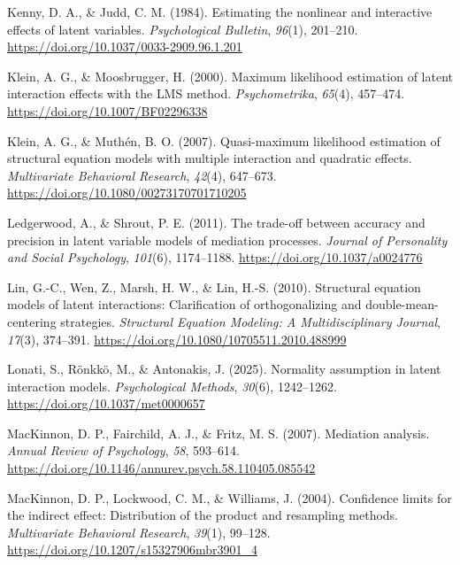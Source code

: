 \documentclass[
  man,
  longtable,
  nolmodern,
  notxfonts,
  notimes,
  colorlinks=true,linkcolor=blue,citecolor=blue,urlcolor=blue]{apa7}
\newlength{\cslhangindent}
\newenvironment{CSLReferences}[2] %
 {\begin{list}{}{%
  \setlength{\itemindent}{0pt}
  \setlength{\leftmargin}{0pt}
  \setlength{\parsep}{0pt}
  \ifodd #1
   \setlength{\leftmargin}{\cslhangindent}
   \setlength{\itemindent}{-1\cslhangindent}
  \fi
  \setlength{\itemsep}{#2\baselineskip}}}
 {\end{list}}
\begin{document}
\begin{CSLReferences}{1}{0}
Kenny, D. A., \& Judd, C. M. (1984). Estimating the nonlinear and
interactive effects of latent variables. \emph{Psychological Bulletin},
\emph{96}(1), 201--210. \url{https://doi.org/10.1037/0033-2909.96.1.201}

Klein, A. G., \& Moosbrugger, H. (2000). Maximum likelihood estimation
of latent interaction effects with the {LMS} method.
\emph{Psychometrika}, \emph{65}(4), 457--474.
\url{https://doi.org/10.1007/BF02296338}

Klein, A. G., \& Muthén, B. O. (2007). Quasi-maximum likelihood
estimation of structural equation models with multiple interaction and
quadratic effects. \emph{Multivariate Behavioral Research},
\emph{42}(4), 647--673. \url{https://doi.org/10.1080/00273170701710205}

Ledgerwood, A., \& Shrout, P. E. (2011). The trade-off between accuracy
and precision in latent variable models of mediation processes.
\emph{Journal of Personality and Social Psychology}, \emph{101}(6),
1174--1188. \url{https://doi.org/10.1037/a0024776}

Lin, G.-C., Wen, Z., Marsh, H. W., \& Lin, H.-S. (2010). Structural
equation models of latent interactions: Clarification of orthogonalizing
and double-mean-centering strategies. \emph{Structural Equation
Modeling: A Multidisciplinary Journal}, \emph{17}(3), 374--391.
\url{https://doi.org/10.1080/10705511.2010.488999}

Lonati, S., Rönkkö, M., \& Antonakis, J. (2025). Normality assumption in
latent interaction models. \emph{Psychological Methods}, \emph{30}(6),
1242--1262. \url{https://doi.org/10.1037/met0000657}

MacKinnon, D. P., Fairchild, A. J., \& Fritz, M. S. (2007). Mediation
analysis. \emph{Annual Review of Psychology}, \emph{58}, 593--614.
\url{https://doi.org/10.1146/annurev.psych.58.110405.085542}

MacKinnon, D. P., Lockwood, C. M., \& Williams, J. (2004). Confidence
limits for the indirect effect: Distribution of the product and
resampling methods. \emph{Multivariate Behavioral Research},
\emph{39}(1), 99--128. \url{https://doi.org/10.1207/s15327906mbr3901_4}


\end{CSLReferences}
\end{document}
